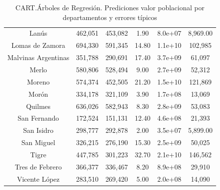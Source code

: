 \documentclass{article}
\theoremstyle{mytheoremstyle}
\theoremstyle{mytheoremstyle}
\theoremstyle{myproblemstyle}
\begin{document}
\begin{table}[htb!]
\begin{tabular}{|c|c|c|c|c|c|}
    Lanús & 462,051 & 453,082 & 1.90 & 8.0e+07 & 8,969.00 \\
    Lomas de Zamora & 694,330 & 591,345 & 14.80 & 1.1e+10 & 102,985 \\
    Malvinas Argentinas & 351,788 & 290,691 & 17.40 & 3.7e+09 & 61,097 \\
    Merlo & 580,806 & 528,494 & 9.00 & 2.7e+09 & 52,312 \\
    Moreno & 574,374 & 452,505 & 21.20 & 1.5e+10 & 121,869 \\
    Morón & 334,178 & 321,109 & 3.90 & 1.7e+08 & 13,069 \\
    Quilmes & 636,026 & 582,943 & 8.30 & 2.8e+09 & 53,083 \\
    San Fernando & 172,524 & 151,131 & 12.40 & 4.6e+08 & 21,393 \\
    San Isidro & 298,777 & 292,878 & 2.00 & 3.5e+07 & 5,899.00 \\
    San Miguel & 326,215 & 276,190 & 15.30 & 2.5e+09 & 50,025 \\
    Tigre & 447,785 & 301,223 & 32.70 & 2.1e+10 & 146,562 \\
    Tres de Febrero & 366,377 & 336,467 & 8.20 & 8.9e+08 & 29,910 \\
    Vicente López & 283,510 & 269,420 & 5.00 & 2.0e+08 & 14,090 \\
    \hline
    \end{tabular}
    \caption{CART.Árboles de Regresión. Prediciones valor poblacional por departamentos y errores típicos}
    \label{tab:CARTResults}
\end{table}
    
\end{document}
